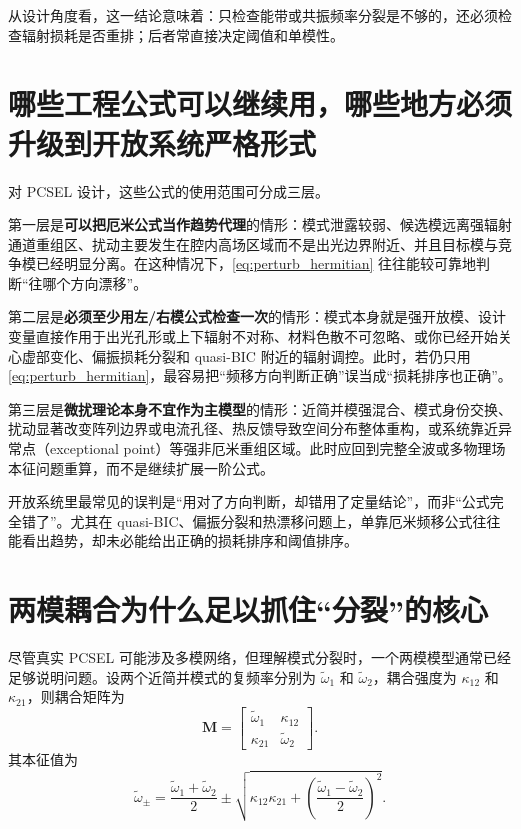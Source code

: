 从设计角度看，这一结论意味着：只检查能带或共振频率分裂是不够的，还必须检查辐射损耗是否重排；后者常直接决定阈值和单模性。

\section{哪些工程公式可以继续用，哪些地方必须升级到开放系统严格形式}
对 PCSEL 设计，这些公式的使用范围可分成三层。

第一层是\textbf{可以把厄米公式当作趋势代理}的情形：模式泄露较弱、候选模远离强辐射通道重组区、扰动主要发生在腔内高场区域而不是出光边界附近、并且目标模与竞争模已经明显分离。在这种情况下，\cref{eq:perturb_hermitian} 往往能较可靠地判断“往哪个方向漂移”。  

第二层是\textbf{必须至少用左/右模公式检查一次}的情形：模式本身就是强开放模、设计变量直接作用于出光孔形或上下辐射不对称、材料色散不可忽略、或你已经开始关心虚部变化、偏振损耗分裂和 quasi-BIC 附近的辐射调控。此时，若仍只用 \cref{eq:perturb_hermitian}，最容易把“频移方向判断正确”误当成“损耗排序也正确”。  

第三层是\textbf{微扰理论本身不宜作为主模型}的情形：近简并模强混合、模式身份交换、扰动显著改变阵列边界或电流孔径、热反馈导致空间分布整体重构，或系统靠近异常点（exceptional point）等强非厄米重组区域。此时应回到完整全波或多物理场本征问题重算，而不是继续扩展一阶公式。

\begin{PitfallBox}
开放系统里最常见的误判是“用对了方向判断，却错用了定量结论”，而非“公式完全错了”。尤其在 quasi-BIC、偏振分裂和热漂移问题上，单靠厄米频移公式往往能看出趋势，却未必能给出正确的损耗排序和阈值排序。
\end{PitfallBox}

\section{两模耦合为什么足以抓住“分裂”的核心}
尽管真实 PCSEL 可能涉及多模网络，但理解模式分裂时，一个两模模型通常已经足够说明问题。设两个近简并模式的复频率分别为 $\tilde\omega_1$ 和 $\tilde\omega_2$，耦合强度为 $\kappa_{12}$ 和 $\kappa_{21}$，则耦合矩阵为
\begin{equation}
\mathbf{M}
=
\begin{bmatrix}
\tilde\omega_1 & \kappa_{12}\\
\kappa_{21} & \tilde\omega_2
\end{bmatrix}.
\label{eq:two_mode_matrix}
\end{equation}
其本征值为
\begin{equation}
\tilde\omega_{\pm}
=
\frac{\tilde\omega_1+\tilde\omega_2}{2}
\pm
\sqrt{\kappa_{12}\kappa_{21}+\left(\frac{\tilde\omega_1-\tilde\omega_2}{2}\right)^2}.
\label{eq:two_mode_split}
\end{equation}

